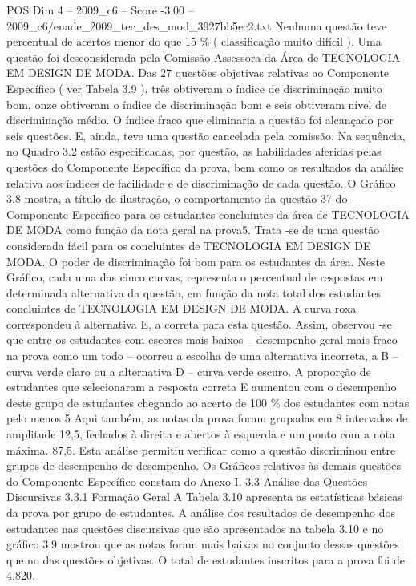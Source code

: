 \begin{textsample}{POS Dim 4 – 2009\_c6 – Score -3.00 – 2009\_c6/enade\_2009\_tec\_des\_mod\_3927bb5ec2.txt}
Nenhuma questão teve percentual de acertos menor do que 15 \% ( classificação muito difícil ).
Uma questão foi desconsiderada pela Comissão Assessora da Área de TECNOLOGIA EM DESIGN DE MODA.
Das 27 questões objetivas relativas ao Componente Específico ( ver Tabela 3.9 ), três obtiveram o índice de discriminação muito bom, onze obtiveram o índice de discriminação bom e seis obtiveram nível de discriminação médio.
O índice fraco que eliminaria a questão foi alcançado por seis questões.
E, ainda, teve uma questão cancelada pela comissão.
Na sequência, no Quadro 3.2 estão especificadas, por questão, as habilidades aferidas pelas questões do Componente Específico da prova, bem como os resultados da análise relativa aos índices de facilidade e de discriminação de cada questão.
O Gráfico 3.8 mostra, a título de ilustração, o comportamento da questão 37 do Componente Específico para os estudantes concluintes da área de TECNOLOGIA DE MODA como função da nota geral na prova5.
Trata -se de uma questão considerada fácil para os concluintes de TECNOLOGIA EM DESIGN DE MODA.
O poder de discriminação foi bom para os estudantes da área.
Neste Gráfico, cada uma das cinco curvas, representa o percentual de respostas em determinada alternativa da questão, em função da nota total dos estudantes concluintes de TECNOLOGIA EM DESIGN DE MODA.
A curva roxa correspondeu à alternativa E, a correta para esta questão.
Assim, observou -se que entre os estudantes com escores mais baixos – desempenho geral mais fraco na prova como um todo – ocorreu a escolha de uma alternativa incorreta, a B – curva verde claro ou a alternativa D – curva verde escuro.
A proporção de estudantes que selecionaram a resposta correta E aumentou com o desempenho deste grupo de estudantes chegando ao acerto de 100 \% dos estudantes com notas pelo menos 5 Aqui também, as notas da prova foram grupadas em 8 intervalos de amplitude 12,5, fechados à direita e abertos à esquerda e um ponto com a nota máxima. 87,5.
Esta análise permitiu verificar como a questão discriminou entre grupos de desempenho de desempenho.
Os Gráficos relativos às demais questões do Componente Específico constam do Anexo I. 3.3 Análise das Questões Discursivas 3.3.1 Formação Geral A Tabela 3.10 apresenta as estatísticas básicas da prova por grupo de estudantes.
A análise dos resultados de desempenho dos estudantes nas questões discursivas que são apresentados na tabela 3.10 e no gráfico 3.9 mostrou que as notas foram mais baixas no conjunto dessas questões que no das questões objetivas.
O total de estudantes inscritos para a prova foi de 4.820.

\end{textsample}
